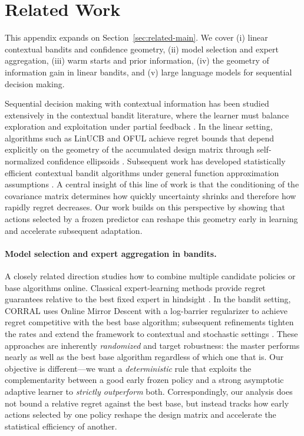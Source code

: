 \documentclass{article}
\theoremstyle{definition}
\theoremstyle{remark}
\theoremstyle{remark}
\begin{document}
\section{Related Work}\label{sec:related}
This appendix expands on Section~\ref{sec:related-main}. We cover (i) linear contextual bandits and confidence geometry,
(ii) model selection and expert aggregation, (iii) warm starts and prior
information, (iv) the geometry of information gain in linear bandits, and
(v) large language models for sequential decision making.

Sequential decision making with contextual information has been studied
extensively in the contextual bandit literature, where the learner must
balance exploration and exploitation under partial feedback
\cite{langford2007epoch,agarwal2014taming,foster2021statistical,
lattimore2020bandit}. In the linear setting, algorithms such as LinUCB and
OFUL achieve regret bounds that depend explicitly on the geometry of the
accumulated design matrix through self-normalized confidence ellipsoids
\cite{chu2011contextual,abbasi2011improved}. Subsequent work has developed
statistically efficient contextual bandit algorithms under general function
approximation assumptions \cite{agarwal2012contextual,foster2018practical,
foster2020beyond,simchi2022bypassing,zhu2022contextual,rucker2023infinite,
zhang2024efficient}. A central insight of this line of work is that the
conditioning of the covariance matrix determines how quickly uncertainty
shrinks and therefore how rapidly regret decreases. Our work builds on this
perspective by showing that actions selected by a frozen predictor can
reshape this geometry early in learning and accelerate subsequent adaptation.

\paragraph{Model selection and expert aggregation in bandits.}
A closely related direction studies how to combine multiple candidate
policies or base algorithms online. Classical expert-learning methods provide
regret guarantees relative to the best fixed expert in hindsight
\cite{auer2002nonstochastic}. In the bandit setting, CORRAL
\cite{agarwal2017corralling} uses Online Mirror Descent with a log-barrier
regularizer to achieve regret competitive with the best base algorithm;
subsequent refinements tighten the rates and extend the framework to
contextual and stochastic settings
\cite{pacchiano2020model,marinov2021pareto,zhu2022pareto,zhu2022near,
dann2024data}. These approaches are inherently \emph{randomized} and target
robustness: the master performs nearly as well as the best base algorithm
regardless of which one that is. Our objective is different---we want a
\emph{deterministic} rule that exploits the complementarity between a good
early frozen policy and a strong asymptotic adaptive learner to
\emph{strictly outperform} both. Correspondingly, our analysis does not
bound a relative regret against the best base, but instead tracks how early
actions selected by one policy reshape the design matrix and accelerate the
statistical efficiency of another.
\end{document}
